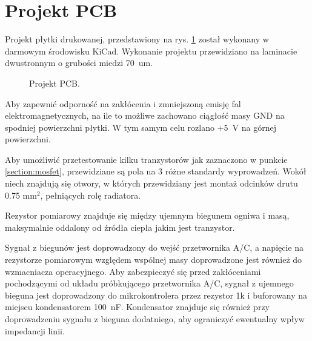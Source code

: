 \documentclass[polish,engineer]{polsl-msth}
\begin{document}
\section{Projekt PCB}
Projekt płytki drukowanej, przedstawiony na rys. \ref{img:pcb_colored} został wykonany w darmowym środowisku KiCad. Wykonanie projektu przewidziano na laminacie dwustronnym o grubości miedzi 70~um.

\begin{figure}[hbtp]
     \caption{Projekt PCB. \label{img:pcb_colored}}
\end{figure}

Aby zapewnić odporność na zakłócenia i zmniejszoną emisję fal elektromagnetycznych, na ile to możliwe zachowano ciągłość masy GND na spodniej powierzchni płytki. W tym samym celu rozlano +5~V na górnej powierzchni. 

Aby umożliwić przetestowanie kilku tranzystorów jak zaznaczono w punkcie \ref{section:mosfet}, przewidziane są pola na 3 różne standardy wyprowadzeń. Wokół niech znajdują się otwory, w których przewidziany jest montaż odcinków drutu 0.75 mm$^2$, pełniących rolę radiatora.

Rezystor pomiarowy znajduje się między ujemnym biegunem ogniwa i masą, maksymalnie oddalony od źródła ciepła jakim jest tranzystor. 

Sygnał z biegunów jest doprowadzony do wejść przetwornika A/C, a napięcie na rezystorze pomiarowym względem wspólnej masy doprowadzone jest również do wzmacniacza operacyjnego. Aby zabezpieczyć się przed zakłóceniami pochodzącymi od układu próbkującego przetwornika A/C, sygnał z ujemnego bieguna jest doprowadzony do mikrokontrolera przez rezystor 1k i buforowany na miejscu kondensatorem 100~nF. Kondensator znajduje się również przy doprowadzeniu sygnału z bieguna dodatniego, aby ograniczyć ewentualny wpływ impedancji linii.
\end{document}
